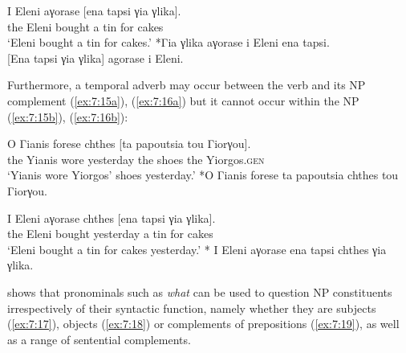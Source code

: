 \documentclass[output=paper]{langsci/langscibook}
\begin{document}
\begin{exe}
\ex \label{ex:7:14}
\begin{xlist}
\ex \label{ex:7:14a}
\gll  I Eleni aγorase [ena tapsi γia γlika].\\
                       the Eleni bought a tin for cakes\\
\glt         `Eleni bought a tin for cakes.'
\ex \label{ex:7:14b}
*Γia γlika aγorase i Eleni ena tapsi.\\
\ex \label{ex:7:14c}
{[}Ena tapsi γia γlika{]} agorase i Eleni.\\
\end{xlist}
\end{exe}

Furthermore, a temporal adverb may occur between the verb and its NP complement (\ref{ex:7:15a}), (\ref{ex:7:16a}) but it cannot occur within the NP (\ref{ex:7:15b}), (\ref{ex:7:16b}):


\begin{exe}
\ex \label{ex:7:15}
\begin{xlist}
\ex \label{ex:7:15a}
\gll  O Γianis forese chthes [ta papoutsia tou Γiorγou].\\
     the Yianis wore yesterday the shoes the Yiorgos.\textsc{gen}\\
\glt `Yianis wore Yiorgos’ shoes yesterday.'
\ex \label{ex:7:15b}
*O Γianis forese ta papoutsia chthes tou Γiorγou.\\
\end{xlist}
\end{exe}

\begin{exe}
\ex \label{ex:7:16}
\begin{xlist}
\ex \label{ex:7:16a}
\gll  I Eleni aγorase chthes [ena tapsi γia γlika].\\
     the Eleni bought yesterday a tin for cakes\\
\glt `Eleni bought a tin for cakes yesterday.'
\ex \label{ex:7:16b}
* I Eleni aγorase ena tapsi chthes γia γlika.\\
\end{xlist}
\end{exe}

\citet{radford1988} shows that pronominals such as \textit{what} can be used to question NP constituents irrespectively of their syntactic function, namely whether they are subjects (\ref{ex:7:17}), objects (\ref{ex:7:18}) or complements of prepositions (\ref{ex:7:19}),  as well as a range of sentential complements. 
\end{document}

